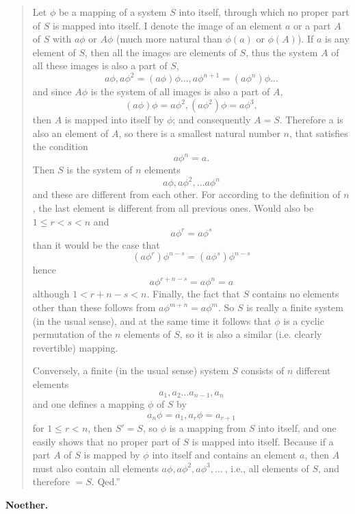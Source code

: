 \documentclass[leqno,hidelinks]{article}
\theoremstyle{definition}
\begin{document}
\begin{paracol}{2}
\begin{quote}
\hspace{12pt} Let $\phi$ be a mapping of a system $S$ into itself, through which
no proper part of $S$ is mapped into itself. I denote the image of an element $a$
or a part $A$ of $S$ with $a\phi$ or $A\phi$ (much more natural than $\phi(a)$
or $\phi(A)$). If $a$ is any element of $S$, then all the images are elements of
$S$, thus the system $A$ of all these images is also a part of $S$,
\vspace{14pt}
\[
	a\phi, a\phi^2= (a\phi)\phi \ldots, a\phi^{n+1} = (a\phi^n)\phi \ldots
\]
and since $A\phi$ is the system of all images is also a part of $A$,
\[
	(a\phi) \phi = a\phi^2, (a\phi^2)\phi = a\phi^3,
\]
then $A$ is mapped into itself by $\phi$; and consequently $A = S$. Therefore a
is also an element of $A$, so there is a smallest natural number $n$, that
satisfies the condition
\[
	a\phi^n = a.
\]
Then $S$ is the system of $n$ elements
\[
	a\phi,a\phi^2,\ldots a\phi^n
\]
and these are different from each other.
For according to the definition of $n$, the last element is different from all
previous ones. Would also be $1 \leq r<s < n$ and
\[
	a\phi^r = a\phi^s
\]
than it would be the case that
\[
	(a\phi^r)\phi^{n-s} = (a\phi^s) \phi^{n-s}
\]
hence
\[
	a\phi^{r+n-s} = a\phi^n=a
\]
although $1<r+n-s<n$.
Finally, the fact that $S$ contains no elements other than these follows from
$a\phi^{m + n} = a\phi^m$. So $S$ is really a finite system (in the usual sense),
and at the same time it follows that $\phi$ is a cyclic permutation of the $n$
elements of $S$, so it is also a similar (i.e. clearly revertible) mapping.

\hspace{12pt} Conversely, a finite (in the usual sense) system $S$ consists of
$n$ different elements
\[
	a_1, a_2 \ldots a_{n-1}, a_n
\]
and one defines a mapping $\phi$ of $S$ by
\[
a_n\phi = a_1, a_r\phi=a_{r+1}
\]
for $1\leq r<n$, then $S' = S$, so $\phi$ is a mapping from $S$ into itself, and
one easily shows that no proper part of $S$ is mapped into itself. Because if
a part $A$ of $S$ is mapped by $\phi$ into itself and contains an element $a$,
then $A$ must also contain all elements $a\phi, a\phi^2, a\phi^3, \ldots \ $, i.e.,
all elements of $S$, and therefore $= S$. Qed.''
\end{quote}

\begin{flushright}\textbf{Noether.}\end{flushright}


\end{paracol}
\end{document}
